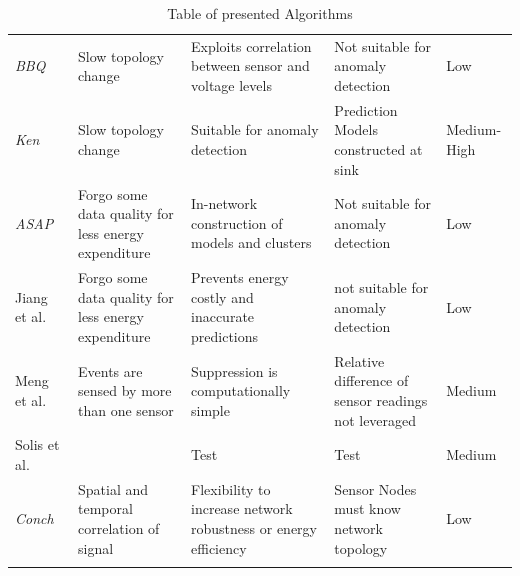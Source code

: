 \begin{longtable} { |p{}||p{}|p{}|p{}|p{}| }
        \textit{BBQ}~\cite{deshpande2004model}& Slow topology change & Exploits
        correlation between sensor and voltage levels & Not suitable for
        anomaly detection & Low\\ %

        \textit{Ken}~\cite{chu2006approximate}& Slow topology
        change~\cite{gedik2007asap} & Suitable for anomaly detection &
        Prediction Models constructed at sink~\cite{gedik2007asap}  &
        Medium-High~\cite{gedik2007asap}\\ %

        \textit{ASAP}~\cite{gedik2007asap}& Forgo some data quality for less
        energy expenditure & In-network construction of models and clusters &
        Not suitable for anomaly detection & Low\\ %

        Jiang et al.~\cite{jiang2011prediction}& Forgo some data quality for
        less energy expenditure & Prevents energy costly and inaccurate
        predictions & not suitable for anomaly detection & Low\\

        Meng et al.~\cite{meng2004event}& Events are sensed by more than one
        sensor & Suppression is computationally simple & Relative difference of
        sensor readings not leveraged~\cite{silberstein2006constraint}& Medium\\

        Solis et al.~\cite{solis2005efficient}&  & Test & Test & Medium\\ %

        \textit{Conch}~\cite{silberstein2006constraint}& Spatial and temporal
        correlation of signal & Flexibility to increase network robustness or
        energy efficiency & Sensor Nodes must know network
        topology~\cite{trihinas2017admin}& Low\\ %

        \hline
        \caption{Table of presented Algorithms}
        \label{table:algorithm table}
        \end{longtable}

\FloatBarrier


\subsection{\catI} %
\label{sec:catI}

